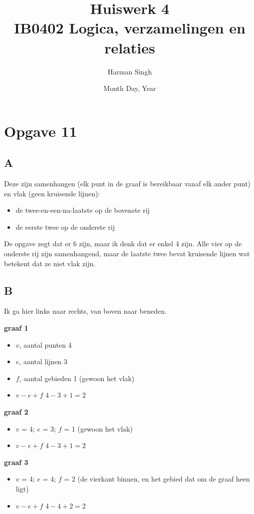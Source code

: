 \documentclass[11pt, a4paper]{article}
\title{Huiswerk 4 \\ IB0402 Logica, verzamelingen en relaties}
\author{Harman Singh}
\date{Month Day, Year}
\begin{document}
\maketitle

\pagebreak
\section*{Opgave 11}

\subsection*{A}

Deze zijn samenhangen (elk punt in de graaf is bereikbaar vanaf elk ander punt) en vlak (geen kruisende lijnen):

\begin{itemize}
	\item de twee-en-een-na-laatste op de bovenste rij
	\item de eerste twee op de onderste rij
\end{itemize}

De opgave zegt dat er 6 zijn, maar ik denk dat er enkel 4 zijn. Alle vier op de onderste rij zijn samenhangend, maar de laatste twee bevat kruisende lijnen wat betekent dat ze niet vlak zijn.


\subsection*{B}

Ik ga hier links naar rechts, van boven naar beneden.

\textbf{graaf 1}
\begin{itemize}
	\item $v$, aantal punten \hfill 4
	\item $e$, aantal lijnen \hfill 3
	\item $f$, aantal gebieden \hfill 1 (gewoon het vlak)
	\item $v-e+f$ \hfill $\boxed{4 - 3 + 1 = 2}$
\end{itemize}



\textbf{graaf 2}
\begin{itemize}
	\item $v$ = 4; $e$ = 3; $f$ = 1 (gewoon het vlak)
	\item $v-e+f$ \hfill $\boxed{4 - 3 + 1 = 2}$
\end{itemize}


\textbf{graaf 3}
\begin{itemize}
	\item $v$ = 4; $e$ = 4; $f$ = 2 (de vierkant binnen, en het gebied dat om de graaf heen ligt)
	\item $v-e+f$ \hfill $\boxed{4 - 4 + 2 = 2}$
\end{itemize}
\end{document}
